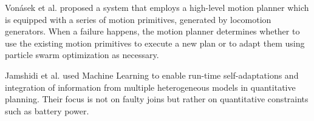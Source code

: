 Vonásek et al. \cite{vonasek2015online} proposed a system that employs a high-level motion planner which is equipped with a series of motion primitives, generated by locomotion generators. When a failure happens, the motion planner determines whether to use the existing motion primitives to execute a new plan or to adapt them using particle swarm optimization as necessary.  

Jamshidi et al. \cite{jamshidi2019machine} used Machine Learning to enable run-time self-adaptations and integration of information from multiple heterogeneous models in quantitative planning. Their focus is not on faulty joins but rather on quantitative constraints such as battery power.




